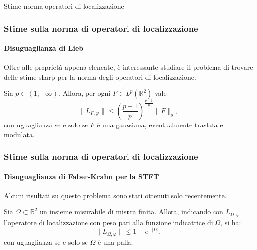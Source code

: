 \documentclass[aspectratio=141]{beamer}
\newcommand{\R}{\mathbb{R}} %
\newcommand{\V}{\mathcal{V}} %
\newcommand{\C}{\mathbb{C}} %
\begin{document}
\begin{section}{Stime norma operatori di localizzazione}
	
	\begin{frame}
		\frametitle{Stime sulla norma di operatori di localizzazione}
		\framesubtitle{Disuguaglianza di Lieb}
		Oltre alle proprietà appena elencate, è interessante studiare il problema di trovare delle stime sharp per la norma degli operatori di localizzazione.
		\pause
		\begin{myblock}
			Sia $p \in (1,+\infty)$. Allora, per ogni $F \in L^p(\R^2)$ vale
			\begin{equation}\label{stima Lieb}
				\|L_{F,\varphi}\| \leq \left(\dfrac{p-1}{p}\right)^{\frac{p-1}{p}} \|F\|_p,
			\end{equation}
			con uguaglianza se e solo se $F$ è una gaussiana, eventualmente traslata e modulata.
		\end{myblock}
	\end{frame}

	\begin{frame}
		\frametitle{Stime sulla norma di operatori di localizzazione}
		\framesubtitle{Disuguaglianza di Faber-Krahn per la STFT}
		Alcuni risultati su questo problema sono stati ottenuti solo recentemente.
		\begin{myblock}
			Sia $\Omega \subset \R^2$ un insieme misurabile di misura finita. Allora, indicando con $L_{\Omega, \varphi}$ l'operatore di localizzazione con peso pari alla funzione indicatrice di $\Omega$, si ha:
			\begin{equation*}
				\|L_{\Omega, \varphi}\| \leq 1 - e^{- |\Omega|},
			\end{equation*}
			con uguaglianza se e solo se $\Omega$ è una palla.
		\end{myblock}
	\end{frame}
	

\end{section}
\end{document}
